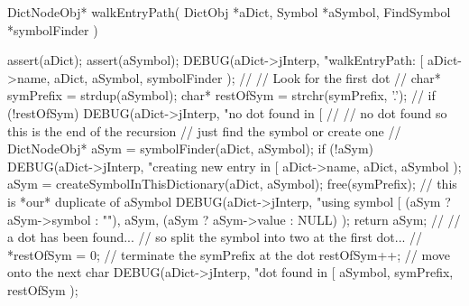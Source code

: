 \startCCode
DictNodeObj* walkEntryPath(
  DictObj    *aDict,
  Symbol     *aSymbol,
  FindSymbol *symbolFinder
) {
  assert(aDict);
  assert(aSymbol);
  DEBUG(aDict->jInterp,
    "walkEntryPath: [%
    aDict->name, aDict, aSymbol, symbolFinder
  );
  //
  // Look for the first dot
  //
  char* symPrefix = strdup(aSymbol);
  char* restOfSym = strchr(symPrefix, '.');
  //
  if (!restOfSym) {
    DEBUG(aDict->jInterp, "no dot found in [%
    //
    // no dot found so this is the end of the recursion
    // just find the symbol or create one
    //
    DictNodeObj* aSym = symbolFinder(aDict, aSymbol);
    if (!aSym) {
      DEBUG(aDict->jInterp,
        "creating new entry in [%
        aDict->name, aDict, aSymbol
      );
      aSym = createSymbolInThisDictionary(aDict, aSymbol);
    }
    free(symPrefix); // this is *our* duplicate of aSymbol
    DEBUG(aDict->jInterp,
      "using symbol [%
      (aSym ? aSym->symbol : ""),
      aSym,
      (aSym ? aSym->value : NULL)
    );
    return aSym;
  }
  //
  // a dot has been found...
  // so split the symbol into two at the first dot...
  //
  *restOfSym = 0; // terminate the symPrefix at the dot
  restOfSym++;    // move onto the next char
  DEBUG(aDict->jInterp,
    "dot found in [%
    aSymbol, symPrefix, restOfSym
  );

}
